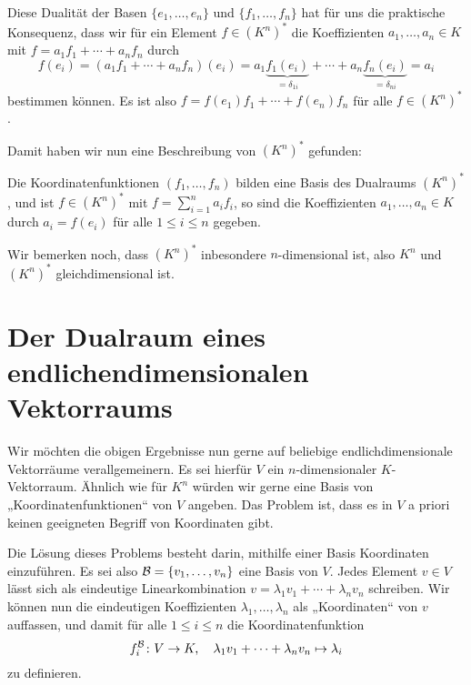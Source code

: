 \documentclass[a4paper,10pt]{article}
\begin{document}
Diese Dualität der Basen $\{e_1, \dotsc, e_n\}$ und $\{f_1, \dotsc, f_n\}$ hat für uns die praktische Konsequenz, dass wir für ein Element $f \in (K^n)^*$ die Koeffizienten $a_1, \dotsc, a_n \in K$ mit $f = a_1 f_1 + \dotsb + a_n f_n$ durch
\begin{equation}\label{eq: coefficients and duality}
 f(e_i)
 = (a_1 f_1 + \dotsb + a_n f_n)(e_i)
 = a_1 \underbrace{f_1(e_i)}_{=\delta_{1i}} + \dotsb + a_n \underbrace{f_n(e_i)}_{=\delta_{ni}}
 = a_i
\end{equation}
bestimmen können. Es ist also $f = f(e_1) f_1 + \dotsb + f(e_n) f_n$ für alle $f \in (K^n)^*$.

Damit haben wir nun eine Beschreibung von $(K^n)^*$ gefunden:

\begin{shaded}
 Die Koordinatenfunktionen $(f_1, \dotsc, f_n)$ bilden eine Basis des Dualraums $(K^n)^*$, und ist $f \in (K^n)^*$ mit $f = \sum_{i=1}^n a_i f_i$, so sind die Koeffizienten $a_1, \dotsc, a_n \in K$ durch $a_i = f(e_i)$ für alle $1 \leq i \leq n$ gegeben.
\end{shaded}

Wir bemerken noch, dass $(K^n)^*$ inbesondere $n$-dimensional ist, also $K^n$ und $(K^n)^*$ gleichdimensional ist.






\section{Der Dualraum eines endlichendimensionalen Vektorraums}
Wir möchten die obigen Ergebnisse nun gerne auf beliebige endlichdimensionale Vektorräume verallgemeinern. Es sei hierfür $V$ ein $n$-dimensionaler $K$-Vektorraum. Ähnlich wie für $K^n$ würden wir gerne eine Basis von „Koordinatenfunktionen“ von $V$ angeben. Das Problem ist, dass es in $V$ a priori keinen geeigneten Begriff von Koordinaten gibt.

Die Lösung dieses Problems besteht darin, mithilfe einer Basis Koordinaten einzuführen. Es sei also $\mathcal{B} = \{v_1, \dotsc, v_n\}$ eine Basis von $V$. Jedes Element $v \in V$ lässt sich als eindeutige Linearkombination $v = \lambda_1 v_1 + \dotsb + \lambda_n v_n$ schreiben. Wir können nun die eindeutigen Koeffizienten $\lambda_1, \dotsc, \lambda_n$ als „Koordinaten“ von $v$ auffassen, und damit für alle $1 \leq i \leq n$ die Koordinatenfunktion
\[
 f^{\mathcal{B}}_i \colon V \to K, \quad \lambda_1 v_1 + \dotsb + \lambda_n v_n \mapsto \lambda_i
\]
zu definieren.
\end{document}
